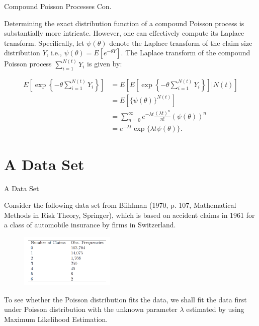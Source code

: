 \documentclass{beamer}
\begin{document}
\begin{frame}{Compound Poisson Processes Con.}

    {\footnotesize \footnotesize
    \par Determining the exact distribution function of a compound Poisson process
    is substantially more intricate. However, one can effectively compute its Laplace
    transform. Specifically, let \(\psi(\theta)\) denote the Laplace transform of the claim size distribution \(Y\), i.e., \(\psi(\theta) = E[e^{-\theta Y}]\). 
    The Laplace transform of the compound Poisson process \(\sum_{i=1}^{N(t)} Y_i\) is given by:

    \vspace{1em}
    \begin{align*}
        E \left[ \exp\left\{ -\theta \sum_{i=1}^{N(t)} Y_i \right\} \right] 
        &= E \left[ E \left[ \exp\left\{ -\theta \sum_{i=1}^{N(t)} Y_i \right\} \right] \bigg| N(t) \right] \\
        &= E \left[ \{\psi(\theta)\}^{N(t)} \right] \\
        &= \sum_{n=0}^{\infty} e^{-\lambda t} \frac{(\lambda t)^n}{n!} (\psi(\theta))^n \\
        &= e^{-\lambda t} \exp \{\lambda t \psi(\theta)\}.
    \end{align*}
    
    }
    
\end{frame}


\section{A Data Set}
\begin{frame}{A Data Set}

    {\footnotesize \footnotesize
    \par  Consider the following data set from Biihlman (1970, p. 107, Mathematical Methods in Risk Theory, Springer), 
    which is based on accident claims in 1961 for a class of automobile insurance by firms in Switzerland.
    \begin{figure}
    \centering
    \includegraphics[width=0.4\textwidth]{2025-09-08 155257}
    \end{figure}
    \par To see whether the Poisson distribution fits the data, 
    we shall fit the data first under Poisson distribution with the 
    unknown parameter $\lambda$ estimated by using Maximum Likelihood Estimation.



    }
    
\end{frame}
\end{document}
